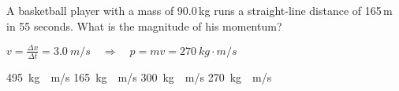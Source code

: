 \documentclass[]{exam}
\begin{document}
\begin{questions}








\question %
A basketball player with a mass of 90.0\,kg runs a straight-line distance of 165\,m in 55 seconds.  What is the magnitude of his momentum?

\ifprintanswers
{\color{red}  $v = \frac{\Delta x}{\Delta t} = \SI{3.0}{m/s} \quad \Rightarrow \quad p = m v = \SI{270}{kg\cdot m/s}$ }
\fi

\begin{randomizechoices}
    \choice \SI{495}{kg\cdot m/s}
    \choice \SI{165}{kg\cdot m/s}
    \choice \SI{300}{kg\cdot m/s}
    \correctchoice \SI{270}{kg\cdot m/s}
\end{randomizechoices}







\end{questions}
\end{document}
